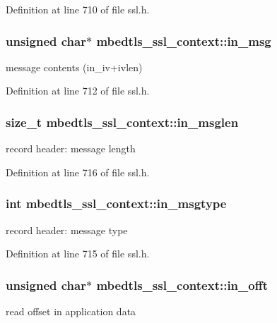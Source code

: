 Definition at line 710 of file ssl.\-h.

\hypertarget{structmbedtls__ssl__context_a9c55d8cac2040048e56a6a2a694375c8}{
\subsubsection[{in\-\_\-msg}]{\setlength{\rightskip}{0pt plus 5cm}unsigned char$\ast$ mbedtls\-\_\-ssl\-\_\-context\-::in\-\_\-msg}}\label{structmbedtls__ssl__context_a9c55d8cac2040048e56a6a2a694375c8}
message contents (in\-\_\-iv+ivlen) 

Definition at line 712 of file ssl.\-h.

\hypertarget{structmbedtls__ssl__context_adfee31e1e5269ab17d1df707025df30a}{
\subsubsection[{in\-\_\-msglen}]{\setlength{\rightskip}{0pt plus 5cm}size\-\_\-t mbedtls\-\_\-ssl\-\_\-context\-::in\-\_\-msglen}}\label{structmbedtls__ssl__context_adfee31e1e5269ab17d1df707025df30a}
record header\-: message length 

Definition at line 716 of file ssl.\-h.

\hypertarget{structmbedtls__ssl__context_aa2283450c4e546808af09c943f115780}{
\subsubsection[{in\-\_\-msgtype}]{\setlength{\rightskip}{0pt plus 5cm}int mbedtls\-\_\-ssl\-\_\-context\-::in\-\_\-msgtype}}\label{structmbedtls__ssl__context_aa2283450c4e546808af09c943f115780}
record header\-: message type 

Definition at line 715 of file ssl.\-h.

\hypertarget{structmbedtls__ssl__context_af07148a2eb35b01d63b3f6d9b59e58df}{
\subsubsection[{in\-\_\-offt}]{\setlength{\rightskip}{0pt plus 5cm}unsigned char$\ast$ mbedtls\-\_\-ssl\-\_\-context\-::in\-\_\-offt}}\label{structmbedtls__ssl__context_af07148a2eb35b01d63b3f6d9b59e58df}
read offset in application data 

